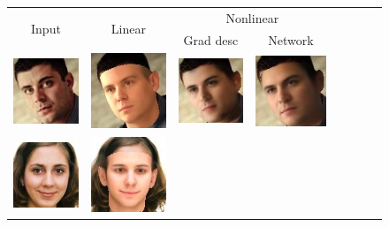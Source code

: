 \begin{figure}[t!]
\begin{center}
\small
\setlength{\tabcolsep}{3pt}
\begin{tabular}{ @{}c@{}c@{}c@{}c@{}c@{}c@{}c@{\hskip 1.5mm}c@{}}
\multirow{2}{*}{Input} & \multirow{2}{*}{Linear} & \multicolumn{2}{c}{Nonlinear} \\ & & Grad desc & Network \\
\includegraphics[width=\afifthcolumn]{img/tex_grad_descent/pred_img_11_gt.jpg} &
\includegraphics[trim=7 7 7 7,clip,width=\afifthcolumn]{img/tex_grad_descent/pred_img_11_linear.jpg} &
\includegraphics[width=\afifthcolumn]{img/tex_grad_descent/pred_img_11.jpg} &
\includegraphics[width=\afifthcolumn]{img/tex_grad_descent/pred_img_11_enc.jpg} &
\\
\includegraphics[width=\afifthcolumn]{img/tex_grad_descent/pred_img_30_gt.jpg} &
\includegraphics[trim=7 7 7 7,clip,width=\afifthcolumn]{img/tex_grad_descent/pred_img_30_linear.jpg} &

\end{tabular}
\end{center}
\end{figure}
